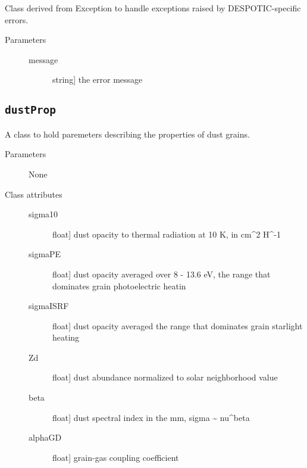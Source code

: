 \documentclass[letterpaper,10pt,english]{sphinxmanual}
\begin{document}
\begin{fulllineitems}
\label{fulldoc:despotic.despoticError}
Class derived from Exception to handle exceptions raised by
DESPOTIC-specific errors.
\begin{description}
\item[{Parameters}] \leavevmode\begin{description}
\item[{message}] \leavevmode{[}string{]}
the error message

\end{description}

\end{description}

\end{fulllineitems}



\subsection{\texttt{dustProp}}
\label{fulldoc:dustprop}

\begin{fulllineitems}
\label{fulldoc:despotic.dustProp}
A class to hold paremeters describing the properties of dust grains.
\begin{description}
\item[{Parameters}] \leavevmode
None

\item[{Class attributes}] \leavevmode\begin{description}
\item[{sigma10}] \leavevmode{[}float{]}
dust opacity to thermal radiation at 10 K, in cm\textasciicircum{}2 H\textasciicircum{}-1

\item[{sigmaPE}] \leavevmode{[}float{]}
dust opacity averaged over 8 - 13.6 eV, the range that
dominates grain photoelectric heatin

\item[{sigmaISRF}] \leavevmode{[}float{]}
dust opacity averaged the range that dominates grain starlight
heating

\item[{Zd}] \leavevmode{[}float{]}
dust abundance normalized to solar neighborhood value

\item[{beta}] \leavevmode{[}float{]}
dust spectral index in the mm, sigma \textasciitilde{} nu\textasciicircum{}beta

\item[{alphaGD}] \leavevmode{[}float{]}
grain-gas coupling coefficient

\end{description}

\end{description}

\end{fulllineitems}
\end{document}
